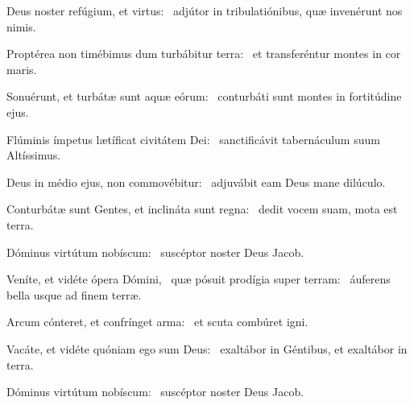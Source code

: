 \item Deus noster refúgium, et virtus:~\psstar{} adjútor in tribulatiónibus, quæ invenérunt nos nimis.

\item Proptérea non timébimus dum turbábitur terra:~\psstar{} et transferéntur montes in cor maris.

\item Sonuérunt, et turbátæ sunt aquæ eórum:~\psstar{} conturbáti sunt montes in fortitúdine ejus.

\item Flúminis ímpetus lætíficat civitátem Dei:~\psstar{} sanctificávit tabernáculum suum Altíssimus.

\item Deus in médio ejus, non commovébitur:~\psstar{} adjuvábit eam Deus mane dilúculo.

\item Conturbátæ sunt Gentes, et inclináta sunt regna:~\psstar{} dedit vocem suam, mota est terra.

\item Dóminus virtútum nobís\-cum:~\psstar{} suscéptor noster Deus Jacob.

\item Veníte, et vidéte ópera Dómini,~\pscross{} quæ pósuit prodígia super terram:~\psstar{} áuferens bella usque ad finem terræ.

\item Arcum cónteret, et confrínget arma:~\psstar{} et scuta combúret igni.

\item Vacáte, et vidéte quóniam ego sum Deus:~\psstar{} exaltábor in Géntibus, et exaltábor in terra.

\item Dóminus virtútum nobís\-cum:~\psstar{} suscéptor noster Deus Jacob.
